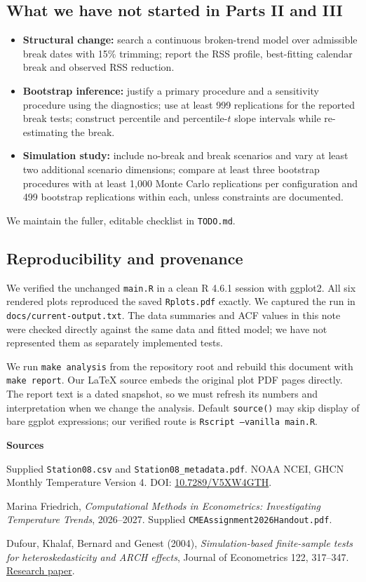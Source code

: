 \documentclass[11pt,a4paper]{article}
\newcommand{\subheading}[1]{\subsection*{\sffamily\color{navy}#1}}
\newcommand{\pending}{\ensuremath{\square}}
\begin{document}
\subheading{What we have not started in Parts II and III}
\begin{itemize}[label=\pending]
\item \textbf{Structural change:} search a continuous broken-trend model over admissible break dates with 15\% trimming; report the RSS profile, best-fitting calendar break and observed RSS reduction.
\item \textbf{Bootstrap inference:} justify a primary procedure and a sensitivity procedure using the diagnostics; use at least 999 replications for the reported break tests; construct percentile and percentile-$t$ slope intervals while re-estimating the break.
\item \textbf{Simulation study:} include no-break and break scenarios and vary at least two additional scenario dimensions; compare at least three bootstrap procedures with at least 1,000 Monte Carlo replications per configuration and 499 bootstrap replications within each, unless constraints are documented.
\end{itemize}
We maintain the fuller, editable checklist in \texttt{TODO.md}.

\subheading{Reproducibility and provenance}
We verified the unchanged \texttt{main.R} in a clean R 4.6.1 session with ggplot2. All six rendered plots reproduced the saved \texttt{Rplots.pdf} exactly. We captured the run in \texttt{docs/current-output.txt}. The data summaries and ACF values in this note were checked directly against the same data and fitted model; we have not represented them as separately implemented tests.

We run \texttt{make analysis} from the repository root and rebuild this document with \texttt{make report}. Our LaTeX source embeds the original plot PDF pages directly. The report text is a dated snapshot, so we must refresh its numbers and interpretation when we change the analysis. Default \texttt{source()} may skip display of bare ggplot expressions; our verified route is \texttt{Rscript --vanilla main.R}.

\vspace{1mm}
{\small
\textbf{Sources}\par
[1] Supplied \texttt{Station08.csv} and \texttt{Station08\_metadata.pdf}. NOAA NCEI, GHCN Monthly Temperature Version 4. DOI: \href{https://doi.org/10.7289/V5XW4GTH}{10.7289/V5XW4GTH}.\par
[2] Marina Friedrich, \emph{Computational Methods in Econometrics: Investigating Temperature Trends}, 2026--2027. Supplied \texttt{CMEAssignment2026Handout.pdf}.\par
[3] Dufour, Khalaf, Bernard and Genest (2004), \emph{Simulation-based finite-sample tests for heteroskedasticity and ARCH effects}, Journal of Econometrics 122, 317--347. \href{https://jeanmariedufour.github.io/Dufour_Khalaf_Bernard_Genest_2004_JE_HeteroskedasticityTests.pdf}{Research paper}.
}
\end{document}
